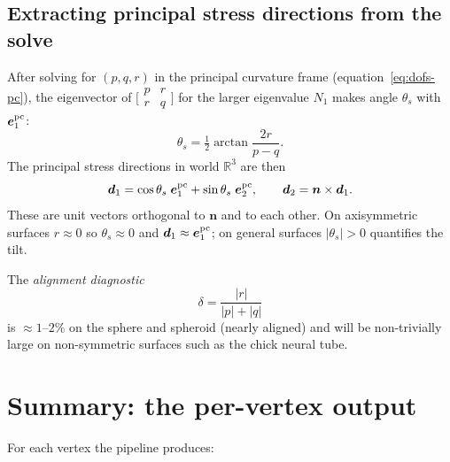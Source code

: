 \documentclass[11pt]{article}
\newcommand{\vv}[1]{\bm{#1}}          %
\newcommand{\nn}{\vv{n}}               %
\newcommand{\R}{\mathbb{R}}
\begin{document}
\subsection{Extracting principal stress directions from the solve}
\label{sec:d1d2}

After solving for $(p,q,r)$ in the principal curvature frame
(equation~\eqref{eq:dofs-pc}), the eigenvector of
$\bigl[\begin{smallmatrix}p&r\\r&q\end{smallmatrix}\bigr]$ for the larger
eigenvalue $N_1$ makes angle $\theta_s$ with $\vv{e}_1^{\rm pc}$:
\begin{equation}
  \theta_s = \tfrac12\arctan\!\frac{2r}{p-q}.
  \label{eq:theta-s}
\end{equation}
The principal stress directions in world $\R^3$ are then
\begin{equation}
  \vv{d}_1 = \cos\theta_s\;\vv{e}_1^{\rm pc} + \sin\theta_s\;\vv{e}_2^{\rm pc},
  \qquad
  \vv{d}_2 = \nn\times\vv{d}_1.
  \label{eq:d1d2}
\end{equation}
These are unit vectors orthogonal to $\nn$ and to each other.  On axisymmetric
surfaces $r\approx 0$ so $\theta_s\approx 0$ and $\vv{d}_1\approx\vv{e}_1^{\rm pc}$;
on general surfaces $|\theta_s|>0$ quantifies the tilt.

The \emph{alignment diagnostic}
\begin{equation}
  \delta = \frac{|r|}{|p|+|q|}
  \label{eq:alignment}
\end{equation}
is $\approx 1$--$2\%$ on the sphere and spheroid (nearly aligned) and
will be non-trivially large on non-symmetric surfaces such as the
chick neural tube.

\section{Summary: the per-vertex output}
\label{sec:output}

For each vertex the pipeline produces:
\end{document}
